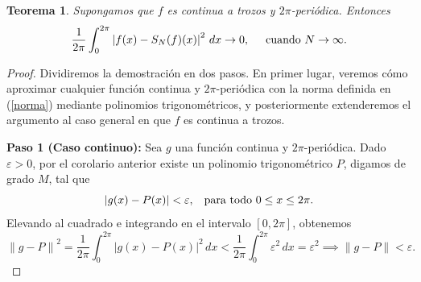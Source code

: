 \documentclass[12pt]{article}
\theoremstyle{plain}
\newtheorem{teorema}{Teorema}[section] %
\theoremstyle{definition}
\numberwithin{equation}{section}
\begin{document}
            \begin{teorema}
                \label{media}
                Supongamos que \(f\) es continua a trozos y \(2\pi\)-periódica. Entonces
                \begin{equation*}
                    \frac{1}{2\pi} \int_{0}^{2\pi} \left\lvert f(x) - S_N (f)(x)\right\rvert^2 \,dx \to 0, \hspace{5mm} \text{cuando \(N \to \infty\)}.
                \end{equation*}
            \end{teorema}
            \begin{proof}
                Dividiremos la demostración en dos pasos. En primer lugar, veremos cómo aproximar cualquier función continua y \(2\pi\)-periódica con la norma definida en (\ref{norma}) mediante polinomios trigonométricos, y posteriormente extenderemos el argumento al caso general en que \(f\) es continua a trozos.

                \textbf{Paso 1 (Caso continuo):} Sea \(g\) una función continua y \(2\pi\)-periódica. Dado \(\varepsilon > 0\), por el corolario anterior existe un polinomio trigonométrico \(P\), digamos de grado \(M\), tal que
                \begin{equation*}
                    \left\lvert g(x) - P(x)\right\rvert < \varepsilon, \hspace{3mm} \text{para todo \(0 \leq x \leq 2\pi\)}.
                \end{equation*}
                Elevando al cuadrado e integrando en el intervalo \([0,2\pi]\), obtenemos
                \begin{equation*}
                    \left\lVert g - P\right\rVert^2 = \frac{1}{2\pi} \int_{0}^{2\pi} \left\lvert g(x) - P(x)\right\rvert^2 \,dx < \frac{1}{2\pi} \int_{0}^{2\pi} \varepsilon^2 \,dx = \varepsilon^2 \implies \left\lVert g - P\right\rVert < \varepsilon.
                \end{equation*}


\end{proof}
\end{document}
